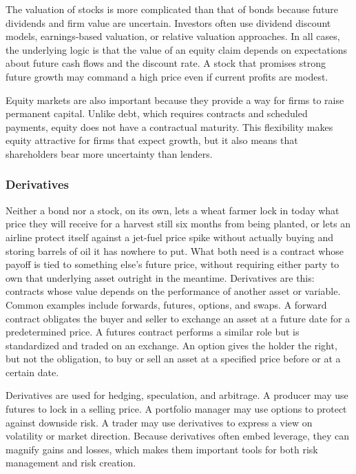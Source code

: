 \documentclass[../ai_in_finance]{subfiles}
\begin{document}
The valuation of stocks is more complicated than that of bonds because future dividends and firm value are uncertain. Investors often use dividend discount models, earnings-based valuation, or relative valuation approaches. In all cases, the underlying logic is that the value of an equity claim depends on expectations about future cash flows and the discount rate. A stock that promises strong future growth may command a high price even if current profits are modest.

Equity markets are also important because they provide a way for firms to raise permanent capital. Unlike debt, which requires contracts and scheduled payments, equity does not have a contractual maturity. This flexibility makes equity attractive for firms that expect growth, but it also means that shareholders bear more uncertainty than lenders.

\subsubsection*{Derivatives}

Neither a bond nor a stock, on its own, lets a wheat farmer lock in today what price they will receive for a harvest still six months from being planted, or lets an airline protect itself against a jet-fuel price spike without actually buying and storing barrels of oil it has nowhere to put. What both need is a contract whose payoff is tied to something else's future price, without requiring either party to own that underlying asset outright in the meantime.
Derivatives are this: contracts whose value depends on the performance of another asset or variable. Common examples include forwards, futures, options, and swaps. A forward contract obligates the buyer and seller to exchange an asset at a future date for a predetermined price. A futures contract performs a similar role but is standardized and traded on an exchange. An option gives the holder the right, but not the obligation, to buy or sell an asset at a specified price before or at a certain date.

Derivatives are used for hedging, speculation, and arbitrage. A producer may use futures to lock in a selling price. A portfolio manager may use options to protect against downside risk. A trader may use derivatives to express a view on volatility or market direction. Because derivatives often embed leverage, they can magnify gains and losses, which makes them important tools for both risk management and risk creation.
\end{document}
